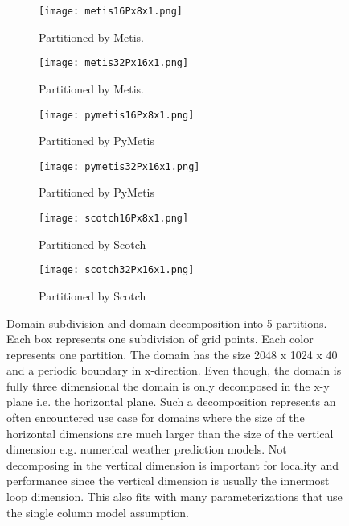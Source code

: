 \begin{figure}[!htbp]
\centering
\begin{subfigure}{0.5\textwidth}
  \centering
  \texttt{[image: metis16Px8x1.png]}
  \caption{Partitioned by Metis.}
  \label{fig:metis1}
\end{subfigure}%
\begin{subfigure}{0.5\textwidth}
  \centering
  \texttt{[image: metis32Px16x1.png]}
  \caption{Partitioned by Metis.}
  \label{fig:metis2}
\end{subfigure}

\begin{subfigure}{0.5\textwidth}
  \centering
  \texttt{[image: pymetis16Px8x1.png]}
  \caption{Partitioned by PyMetis}
  \label{fig:pymetis1}
\end{subfigure}%
\begin{subfigure}{0.5\textwidth}
  \centering
  \texttt{[image: pymetis32Px16x1.png]}
  \caption{Partitioned by PyMetis}
  \label{fig:pymetis2}
\end{subfigure}

\begin{subfigure}{0.5\textwidth}
  \centering
  \texttt{[image: scotch16Px8x1.png]}
  \caption{Partitioned by Scotch}
  \label{fig:scotch1}
\end{subfigure}%
\begin{subfigure}{0.5\textwidth}
  \centering
  \texttt{[image: scotch32Px16x1.png]}
  \caption{Partitioned by Scotch}
  \label{fig:scotch2}
\end{subfigure}

\caption{Domain subdivision and domain decomposition into 5 partitions. 
Each box represents one subdivision of grid points.
Each color represents one partition. 
The domain has the size 2048 x 1024 x 40 and a periodic boundary in x-direction.
Even though, the domain is fully three dimensional the domain is only decomposed in the x-y plane i.e. the horizontal plane.
Such a decomposition represents an often encountered use case for domains where the size of the horizontal dimensions are much larger than the size of the vertical dimension e.g. numerical weather prediction models.
Not decomposing in the vertical dimension is important for locality and performance since the vertical dimension is usually the innermost loop dimension.
This also fits with many parameterizations that use the single column model assumption.
}
\label{fig:rectangular1}
\end{figure}

